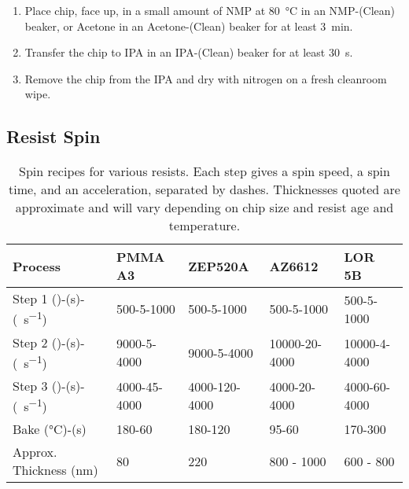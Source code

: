 
\begin{enumerate}
    \item Place chip, face up, in a small amount of NMP at \SI{80}{\celsius} in an NMP-(Clean) beaker, or Acetone in an Acetone-(Clean) beaker for at least \SI{3}{\minute}.
    \item Transfer the chip to IPA in an IPA-(Clean) beaker for at least \SI{30}{\second}.
    \item Remove the chip from the IPA and dry with nitrogen on a fresh cleanroom wipe.
\end{enumerate}

\newcommand{\spinunits}{(\si{\rpm})-(\si{\second})-(\si{\rpm\per\second})}
\subsection{Resist Spin}
\label{sec:spin}

\begin{table}
    \centering
    \hspace*{-1cm}
    \begin{tabular}{lllll}
        \toprule
        Process                                  & PMMA A3     & ZEP520A       & AZ6612       & LOR 5B\\
        \midrule
        Step 1 \spinunits                        & 500-5-1000   & 500-5-1000   & 500-5-1000   & 500-5-1000   \\
        Step 2 \spinunits                        & 9000-5-4000  & 9000-5-4000  & 10000-20-4000& 10000-4-4000 \\
        Step 3 \spinunits                        & 4000-45-4000 & 4000-120-4000& 4000-20-4000 & 4000-60-4000 \\
        Bake (\si{\celsius})-(\si{\second})      & 180-60       & 180-120      & 95-60        & 170-300      \\
        Approx. Thickness (\si{\nano\meter})     & 80           & 220          & 800 - 1000   & 600 - 800    \\
        \bottomrule
    \end{tabular}
    \hspace*{-1cm}
    \caption[Spin recipes for various resists]
    {Spin recipes for various resists. Each step gives a spin speed, a spin time, and an acceleration, separated by dashes.
    Thicknesses quoted are approximate and will vary depending on chip size and resist age and temperature.}
    \label{tab:spin}
\end{table}

